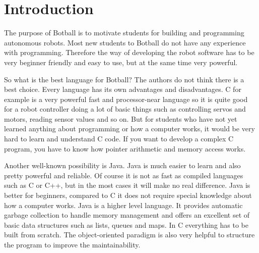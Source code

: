 \documentclass{juniorjournal}
\author[1, \corresp]{Markus Klein}\correspemail{m@mklein.co.at}
\author[1]{Christoph Hackenberger}
\affil[1]{Vienna Institute of Technology (TGM)}
\begin{document}
\maketitle



\section{Introduction}
The purpose of Botball\cite{Botball} is to motivate students for building and programming autonomous robots.
Most new students to Botball\cite{Botball} do not have any experience with programming.
Therefore the way of developing the robot software has to be very beginner friendly and easy to use, 
but at the same time very powerful.

So what is the best language for Botball\cite{Botball}?
The authors do not think there is a best choice.
Every language has its own advantages and disadvantages.
C for example is a very powerful fast and processor-near language so it is quite good for a robot 
controller doing a lot of basic things such as controlling servos and motors, reading sensor values 
and so on. 
But for students who have not yet learned anything about programming or how a computer works, 
it would be very hard to learn and understand C code. 
If you want to develop a complex C program, you have to know how pointer arithmetic and memory 
access works.

Another well-known possibility is Java\cite{Java}. 
Java\cite{Java} is much easier to learn and also pretty powerful and reliable.
Of course it is not as fast as compiled languages such as C or C++, 
but in the most cases it will make no real difference.
Java\cite{Java} is better for beginners, 
compared to C it does not require special knowledge about how a computer works.
Java\cite{Java} is a higher level language.
It provides automatic garbage collection to handle memory management 
and offers an excellent set of basic data structures such as lists, queues and maps.
In C everything has to be built from scratch.
The object-oriented paradigm is also very helpful to structure the program 
to improve the maintainability.
\end{document}
